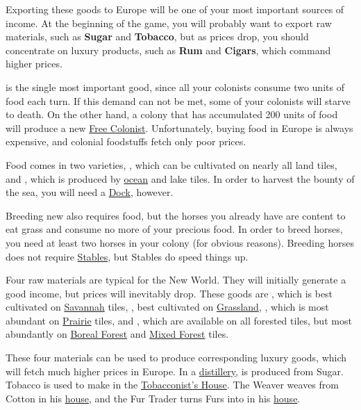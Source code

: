 \documentclass[12pt]{book}
\begin{document}
Exporting these goods to Europe will be one of your most important
sources of income. At the beginning of the game, you will probably
want to export raw materials, such as \textbf{Sugar} and
\textbf{Tobacco}, but as prices drop, you should concentrate on luxury
products, such as \textbf{Rum} and \textbf{Cigars}, which command
higher prices.

 is the single most important good, since all your
colonists consume two units of food each turn. If this demand can not
be met, some of your colonists will starve to death.  On the other
hand, a colony that has accumulated 200 units of food will produce a
new \hyperlink{Free Colonist}{Free Colonist}. Unfortunately, buying
food in Europe is always expensive, and colonial foodstuffs fetch only
poor prices.

Food comes in two varieties, , which can be cultivated on
nearly all land tiles, and , which is produced by
\hyperlink{Ocean}{ocean} and lake tiles. In order to harvest the
bounty of the sea, you will need a \hyperlink{Dock}{Dock}, however.

Breeding new  also requires food, but the horses you
already have are content to eat grass and consume no more of your
precious food. In order to breed horses, you need at least two horses
in your colony (for obvious reasons). Breeding horses does not require
\hyperlink{Stables}{Stables}, but Stables do speed things up.

Four raw materials are typical for the New World. They will initially
generate a good income, but prices will inevitably drop. These goods
are , which is best cultivated on
\hyperlink{Savannah}{Savannah} tiles, , best cultivated
on \hyperlink{Grassland}{Grassland}, , which is most
abundant on \hyperlink{Prairie}{Prairie} tiles, and ,
which are available on all forested tiles, but most abundantly on
\hyperlink{Boreal Forest}{Boreal Forest} and \hyperlink{Mixed
Forest}{Mixed Forest} tiles.

These four materials can be used to produce corresponding luxury
goods, which will fetch much higher prices in Europe. In a
\hyperlink{Distiller's House}{distillery},  is produced
from Sugar. Tobacco is used to make  in the
\hyperlink{Tobacconist's House}{Tobacconist's House}. The Weaver
weaves  from Cotton in his \hyperlink{Weaver's
House}{house}, and the Fur Trader turns Furs into  in his
\hyperlink{Fur Trader's House}{house}.
\end{document}
